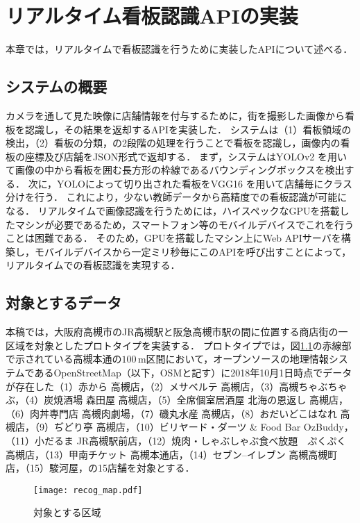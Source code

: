 \chapter{リアルタイム看板認識APIの実装}
\label{chapter:implement_recog}
本章では，リアルタイムで看板認識を行うために実装したAPIについて述べる．

\section{システムの概要}
  カメラを通して見た映像に店舗情報を付与するために，街を撮影した画像から看板を認識し，その結果を返却するAPIを実装した\cite{Kitamura:2018}．
  システムは（1）看板領域の検出，（2）看板の分類，の2段階の処理を行うことで看板を認識し，画像内の看板の座標及び店舗をJSON形式で返却する．
  まず，システムはYOLOv2 \cite{Redmon:2017}を用いて画像の中から看板を囲む長方形の枠線であるバウンディングボックスを検出する．
  次に，YOLOによって切り出された看板をVGG16 \cite{Simonyan:2015}を用いて店舗毎にクラス分けを行う．
  これにより，少ない教師データから高精度での看板認識が可能になる．
  リアルタイムで画像認識を行うためには，ハイスペックなGPUを搭載したマシンが必要であるため，スマートフォン等のモバイルデバイスでこれを行うことは困難である．
  そのため，GPUを搭載したマシン上にWeb APIサーバを構築し，モバイルデバイスから一定ミリ秒毎にこのAPIを呼び出すことによって，リアルタイムでの看板認識を実現する．
  
\section{対象とするデータ}
\label{section:target_data}
  本稿では，大阪府高槻市のJR高槻駅と阪急高槻市駅の間に位置する商店街の一区域を対象としたプロトタイプを実装する．
  プロトタイプでは，図\ref{figure:recog_map}の赤線部で示されている高槻本通の$100\, \mathrm{m}$区間において，オープンソースの地理情報システムであるOpenStreetMap（以下，OSMと記す）\cite{Haklay:2008}に2018年10月1日時点でデータが存在した（1）赤から 高槻店，（2）メサベルテ 高槻店，（3）高槻ちゃぶちゃぶ，（4）炭焼酒場 森田屋 高槻店，（5）全席個室居酒屋 北海の恩返し 高槻店，（6）肉丼専門店 高槻肉劇場，（7）磯丸水産 高槻店，（8）おだいどこはなれ 高槻店，（9）ぢどり亭 高槻店，（10）ビリヤード・ダーツ \& Food Bar OzBuddy，（11）小だるま JR高槻駅前店，（12）焼肉・しゃぶしゃぶ食べ放題　ぷくぷく　高槻店，（13）甲南チケット 高槻本通店，（14）セブン--イレブン 高槻高槻町店，（15）駿河屋，の15店舗を対象とする．
  \begin{figure}[tb]
    \centerline{\texttt{[image: recog\_map.pdf]}}
    \caption{対象とする区域}
    \label{figure:recog_map}
  \end{figure}


